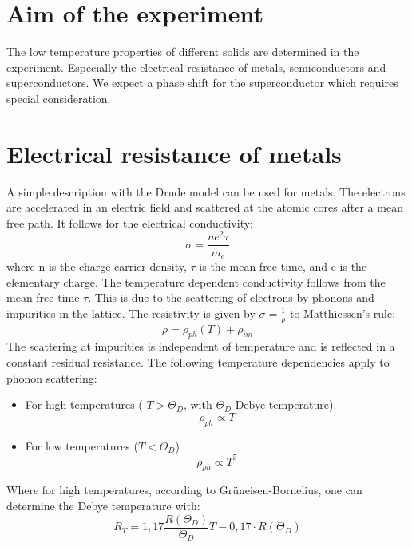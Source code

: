 
\section{Aim of the experiment}
The low temperature properties of different solids are determined in the experiment. Especially the electrical resistance of metals, semiconductors and superconductors. We expect a phase shift for the superconductor which requires special consideration. 

\section{Electrical resistance of metals}


A simple description with the Drude model can be used for metals. The electrons are accelerated in an electric field and scattered at the atomic cores after a mean free path. It follows for the electrical conductivity:
\begin{equation}
    \sigma = \frac{ne^2\tau}{m_e}
\end{equation}
where n is the charge carrier density, $\tau$ is the mean free time, and e is the elementary charge. The temperature dependent conductivity follows from the mean free time $\tau$. This is due to the scattering of electrons by phonons and impurities in the lattice. The resistivity is given by $\sigma =\frac{1}{\rho}$ to Matthiessen's rule:
\begin{equation}
    \rho = \rho_{ph}(T) + \rho_{im}
\end{equation}
The scattering at impurities is independent of temperature and is reflected in a constant residual resistance. The following temperature dependencies apply to phonon scattering:
\begin{itemize}
    \item For high temperatures ( $T > \Theta_D$, with $\Theta_D$ Debye temperature).
    \begin{equation}
        \rho_{ph} \propto T
    \end{equation}
   \item For low temperatures ($T<\Theta_D$) 
    \begin{equation}
        \rho_{ph} \propto T^5
    \end{equation}
    
\end{itemize}
Where for high temperatures, according to Grüneisen-Bornelius, one can determine the Debye temperature with:
\begin{equation}
    R_T = 1,17\frac{R(\Theta_D)}{\Theta_D} T-0,17\cdot R(\Theta_D)
\end{equation}


